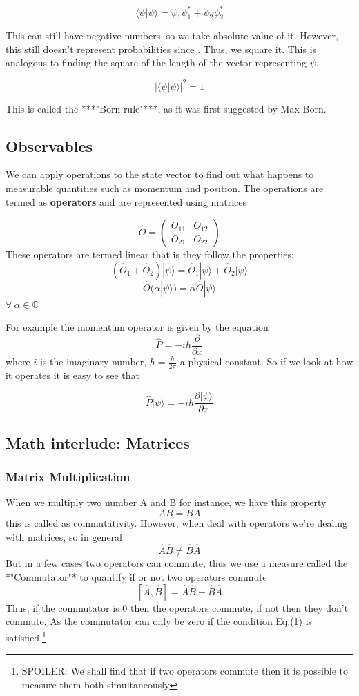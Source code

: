 \documentclass[]{article}
\begin{document}
$$\langle \psi | \psi \rangle = 
\psi_1 \psi^{*}_1 +  \psi_2\psi^{*}_2$$

This can still have negative numbers, so we take absolute value of it. However, this still doesn't represent probabilities since . Thus, we square it. This is analogous to finding the square of the length of the vector representing $\psi$,

$$|\langle \psi |\psi\rangle | ^{2} = 1$$

This is called the ***"Born rule"***, as it was first suggested by Max Born.

\subsection{Observables}

We can apply operations to the state vector to find out what happens to measurable quantities such as momentum and position. The operations are termed as \textbf{operators} and are represented using matrices

$$\hat{O} = \begin{pmatrix}
O_{11} & O_{12}\\
O_{21} & O_{22}
\end{pmatrix}$$
These operators are termed linear that is they follow the properties:
$$(\hat{O}_1 + \hat{O}_2)|\psi\rangle = \hat{O}_1|\psi\rangle+ \hat{O}_2 |\psi\rangle$$
$$\hat{O} (\alpha |\psi\rangle) = \alpha \hat{O} |\psi\rangle$$
$\forall \ \alpha \in \mathbb{C}$

For example the momentum operator is given by the equation
$$\hat{P} = -i \hbar \frac{\partial}{\partial x}$$
where $i$ is the imaginary number, $\hbar = \frac{h}{2 \pi}$ a physical constant. So if we look at how it operates it is easy to see that

$$\hat{P}|\psi\rangle = -i \hbar \frac{\partial | \psi \rangle}{\partial x}$$

\subsection{Math interlude: Matrices}

\subsubsection{Matrix Multiplication}

When we multiply two number A and B for instance, we have this property
$$AB = BA$$
this is called as commutativity. However, when deal with operators we're dealing with matrices, so in general
$$\hat{A}\hat{B} \neq \hat{B}\hat{A}$$
But in a few cases two operators can commute, thus we use a measure called the *"Commutator"* to quantify if or not two operators commute
$$[\hat{A}, \hat{B}] = \hat{A}\hat{B} - \hat{B}\hat{A}$$
Thus, if the commutator is 0 then the operators commute, if not then they don't commute. As the commutator can only be zero if the condition Eq.(1) is satisfied.\footnote{SPOILER: We shall find that if two operators commute then it is possible to measure them both simultaneously}
\end{document}
